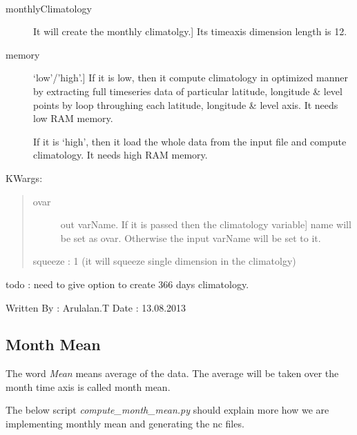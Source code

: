 \documentclass[letterpaper,10pt,english]{sphinxmanual}
\begin{document}
\begin{fulllineitems}
\label{diagnosis:climatology_utils.monthlyClimatology}~\begin{description}
\item[{monthlyClimatology}] \leavevmode{[}It will create the monthly climatolgy.{]}
Its timeaxis dimension length is 12.

\item[{memory}] \leavevmode{[}`low'/'high'.{]}
If it is low, then it compute climatology in optimized
manner by extracting full timeseries data of particular
latitude, longitude \& level points by loop throughing
each latitude, longitude \& level axis. It needs low RAM memory.

If it is `high', then it load the whole data from the input
file and compute climatology. It needs high RAM memory.

\end{description}

KWargs:
\begin{quote}
\begin{description}
\item[{ovar}] \leavevmode{[}out varName. If it is passed then the climatology variable{]}
name will be set as ovar. Otherwise the input varName will
be set to it.

\end{description}

squeeze : 1 (it will squeeze single dimension in the climatolgy)
\end{quote}

todo : need to give option to create 366 days climatology.

Written By : Arulalan.T
Date : 13.08.2013

\end{fulllineitems}



\subsection{Month Mean}
\label{diagnosis:month-mean}
The word \emph{Mean} means average of the data. The average will be taken over the month time axis is called month mean.

The below script \emph{compute\_month\_mean.py} should explain more how we are implementing monthly mean and generating the nc files.
\label{diagnosis:module-compute_month_mean}\label{diagnosis:module-compute_month_mean.py}
\end{document}
